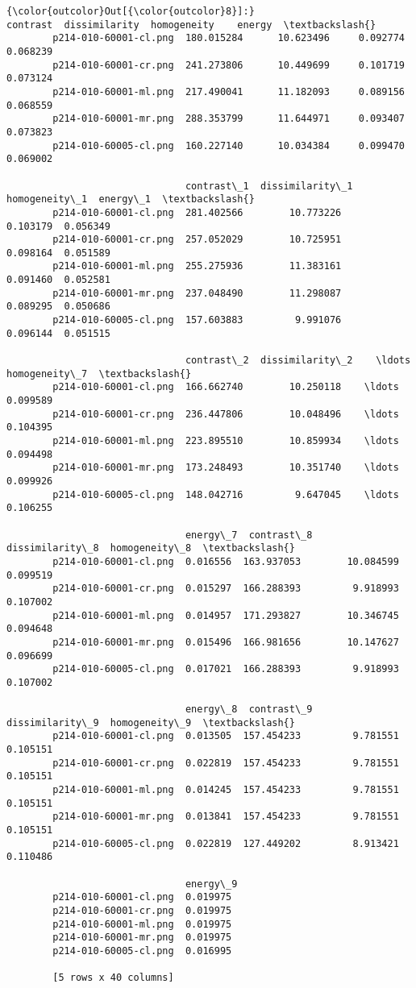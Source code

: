             \begin{Verbatim}[commandchars=\\\{\}]
{\color{outcolor}Out[{\color{outcolor}8}]:}                          contrast  dissimilarity  homogeneity    energy  \textbackslash{}
        p214-010-60001-cl.png  180.015284      10.623496     0.092774  0.068239
        p214-010-60001-cr.png  241.273806      10.449699     0.101719  0.073124
        p214-010-60001-ml.png  217.490041      11.182093     0.089156  0.068559
        p214-010-60001-mr.png  288.353799      11.644971     0.093407  0.073823
        p214-010-60005-cl.png  160.227140      10.034384     0.099470  0.069002

                               contrast\_1  dissimilarity\_1  homogeneity\_1  energy\_1  \textbackslash{}
        p214-010-60001-cl.png  281.402566        10.773226       0.103179  0.056349
        p214-010-60001-cr.png  257.052029        10.725951       0.098164  0.051589
        p214-010-60001-ml.png  255.275936        11.383161       0.091460  0.052581
        p214-010-60001-mr.png  237.048490        11.298087       0.089295  0.050686
        p214-010-60005-cl.png  157.603883         9.991076       0.096144  0.051515

                               contrast\_2  dissimilarity\_2    \ldots     homogeneity\_7  \textbackslash{}
        p214-010-60001-cl.png  166.662740        10.250118    \ldots          0.099589
        p214-010-60001-cr.png  236.447806        10.048496    \ldots          0.104395
        p214-010-60001-ml.png  223.895510        10.859934    \ldots          0.094498
        p214-010-60001-mr.png  173.248493        10.351740    \ldots          0.099926
        p214-010-60005-cl.png  148.042716         9.647045    \ldots          0.106255

                               energy\_7  contrast\_8  dissimilarity\_8  homogeneity\_8  \textbackslash{}
        p214-010-60001-cl.png  0.016556  163.937053        10.084599       0.099519
        p214-010-60001-cr.png  0.015297  166.288393         9.918993       0.107002
        p214-010-60001-ml.png  0.014957  171.293827        10.346745       0.094648
        p214-010-60001-mr.png  0.015496  166.981656        10.147627       0.096699
        p214-010-60005-cl.png  0.017021  166.288393         9.918993       0.107002

                               energy\_8  contrast\_9  dissimilarity\_9  homogeneity\_9  \textbackslash{}
        p214-010-60001-cl.png  0.013505  157.454233         9.781551       0.105151
        p214-010-60001-cr.png  0.022819  157.454233         9.781551       0.105151
        p214-010-60001-ml.png  0.014245  157.454233         9.781551       0.105151
        p214-010-60001-mr.png  0.013841  157.454233         9.781551       0.105151
        p214-010-60005-cl.png  0.022819  127.449202         8.913421       0.110486

                               energy\_9
        p214-010-60001-cl.png  0.019975
        p214-010-60001-cr.png  0.019975
        p214-010-60001-ml.png  0.019975
        p214-010-60001-mr.png  0.019975
        p214-010-60005-cl.png  0.016995

        [5 rows x 40 columns]
\end{Verbatim}

